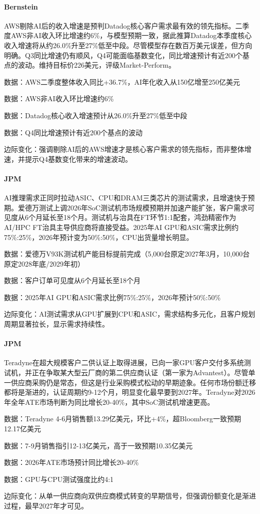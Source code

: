 \documentclass[11pt]{ctexart}
\begin{document}
\paragraph{Bernstein} AWS剔除AI后的收入增速是预判Datadog核心客户需求最有效的领先指标。二季度AWS非AI收入环比增速约6\%，与模型预期一致，据此推算Datadog本季度核心收入增速将从约26.0\%升至27\%低至中段。尽管模型存在数百万美元误差，但方向明确。Q3同比增速仍有顺风，Q4可能面临基数变化，同比增速预计有近200个基点的波动。维持目标价226美元，评级Market-Perform。
{\small\color{refgray}数据：AWS二季度整体收入同比+36.7\%，AI年化收入从150亿增至250亿美元\par}
{\small\color{refgray}数据：AWS非AI收入环比增速约6\%\par}
{\small\color{refgray}数据：Datadog核心收入增速预计从26.0\%升至27\%低至中段\par}
{\small\color{refgray}数据：Q4同比增速预计有近200个基点的波动\par}
{\small\color{refgray}边际变化：强调剔除AI后的AWS增速才是核心客户需求的领先指标，而非整体增速，并提示Q4基数变化带来的增速波动。\par}
\paragraph{JPM} AI推理需求正同时拉动ASIC、CPU和DRAM三类芯片的测试需求，且增速快于预期。爱德万测试上调2026年SoC测试机市场规模预期并加速产能扩张，客户需求可见度从6个月延长至18个月。测试机与治具在FT环节1:1配套，鸿劲精密作为AI/HPC FT治具主导供应商将直接受益。2025年AI GPU和ASIC需求比例约75\%:25\%，2026年预计变为50\%:50\%，CPU出货量增长明显。
{\small\color{refgray}数据：爱德万V93K测试机产能目标提前完成（5,000台原定2027年3月，10,000台原定2028年底/2029年初）\par}
{\small\color{refgray}数据：客户订单可见度从6个月延长至18个月\par}
{\small\color{refgray}数据：2025年AI GPU和ASIC需求比例75\%:25\%，2026年预计50\%:50\%\par}
{\small\color{refgray}边际变化：AI测试需求从GPU扩展到CPU和ASIC，需求结构多元化，且客户规划周期显著拉长，显示需求持续性。\par}
\paragraph{JPM} Teradyne在超大规模客户二供认证上取得进展，已向一家GPU客户交付多系统测试机，并正在争取某大型云厂商的第二供应商认证（第一家为Advantest）。尽管单一供应商采购仍是常态，但这是行业采购模式松动的早期迹象。任何市场份额迁移都将是渐进的，认证周期约9-12个月，明显变化最早要到2027年。Teradyne对2026年全年ATE市场判断为同比增长20-40\%，其中SoC测试机增速更高。
{\small\color{refgray}数据：Teradyne 4-6月销售额13.29亿美元，环比+4\%，超Bloomberg一致预期12.17亿美元\par}
{\small\color{refgray}数据：7-9月销售指引12-13亿美元，高于一致预期10.35亿美元\par}
{\small\color{refgray}数据：2026年ATE市场预计同比增长20-40\%\par}
{\small\color{refgray}数据：GPU与CPU测试强度比约4:1\par}
{\small\color{refgray}边际变化：从单一供应商向双供应商模式转变的早期信号，但强调份额变化是渐进过程，最早2027年才可见。\par}
\end{document}
